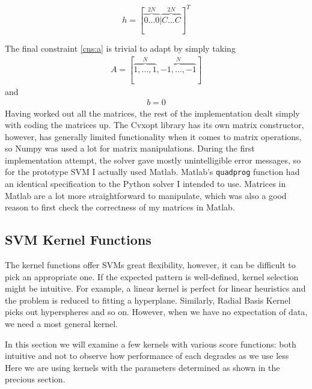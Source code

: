 \documentclass[12pt,notitlepage,twoside]{scrreprt}
\begin{document}
\[h = [\overbrace{0 \dots 0}^{2N}|\overbrace{C \dots C}^{2N}]^T\]

The final constraint \ref{cns:a} is trivial to adapt by simply taking 
\begin{gather*}
A=[\overbrace{1,\dots,1}^N,\overbrace{-1,\dots,-1}^N]
\end{gather*}
and
\begin{gather*}
b=0
\end{gather*}
Having worked out all the matrices, the rest of the implementation dealt simply
with coding the matrices up. The Cvxopt library has its own matrix constructor,
however, has generally limited functionality when it comes to matrix
operations, so Numpy was used a lot for matrix manipulations. During the first
implementation attempt, the solver gave mostly unintelligible error messages,
so for the prototype SVM I actually used Matlab. Matlab's \texttt{quadprog}
function had an identical specification to the Python solver I intended to use.
Matrices in Matlab are a lot more straightforward to manipulate, which was also
a good reason to first check the correctness of my matrices in Matlab.

\subsection{SVM Kernel Functions}
\label{sec:kernels}
The kernel functions offer SVMs great flexibility, however, it can be difficult to pick an
appropriate one. If the expected pattern is well-defined, kernel selection might be
intuitive. For example, a linear kernel is perfect for linear heuristics and the problem
is reduced to fitting a hyperplane.  Similarly, Radial Basis Kernel picks out hyperspheres
and so on. However, when we have no expectation of data, we need a most general kernel.

In this section we will examine a few kernels with various score functions: both intuitive
and not to observe how performance of each degrades as we use less 
Here we are using kernels with the parameters determined as shown in the precious section.
\end{document}
